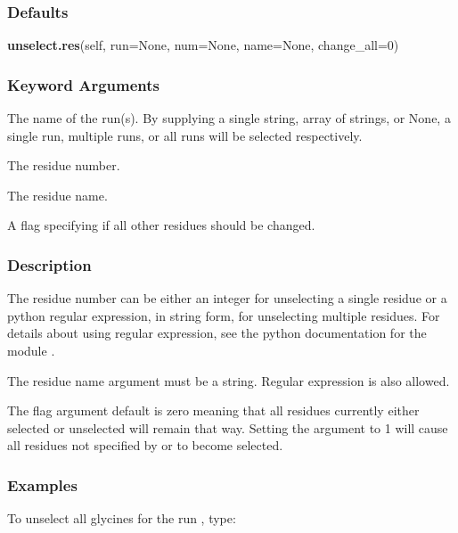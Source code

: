   
 \subsubsection{Defaults} 

 \textsf{\textbf{unselect.res}(self, run=None, num=None, name=None, change\_all=0)} 

  
 \subsubsection{Keyword Arguments} 

   The name of the run(s).  By supplying a single string, array of strings, or None, a single run, multiple runs, or all runs will be selected respectively.   

   The residue number.   

   The residue name.   

   A flag specifying if all other residues should be changed.  

  

  
 \subsubsection{Description} 

 The residue number can be either an integer for unselecting a single residue or a python regular expression, in string form, for unselecting multiple residues.  For details about using regular expression, see the python documentation for the module . 
  

 The residue name argument must be a string.  Regular expression is also allowed. 
  

 The  flag argument default is zero meaning that all residues currently either selected or unselected will remain that way.  Setting the argument to 1 will cause all residues not specified by  or  to become selected. 
  

  
 \subsubsection{Examples} 

 To unselect all glycines for the run , type: 
  

